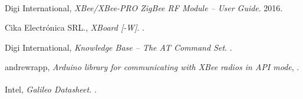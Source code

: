 \documentclass[11pt,oneside,spanish,a4paper]{article}
\begin{document}
\begin{thebibliography}{1}
  Digi International,
  \emph{XBee\textsuperscript{\textregistered{}}/XBee-PRO
    ZigBee\textsuperscript{\textregistered{}} RF Module -- User
    Guide}. 2016.
  
  Cika Electrónica SRL.,
  \emph{XBoard [-W]}.
  .

  Digi International,
  \emph{Knowledge Base -- The AT Command Set}.
  .

  andrewrapp,
\emph{Arduino library for communicating with XBee radios in API mode},
.

  Intel\textsuperscript{\textregistered{}},
  \emph{Galileo Datasheet}.
  .


\end{thebibliography}



% 

% 


% 
\end{document}
